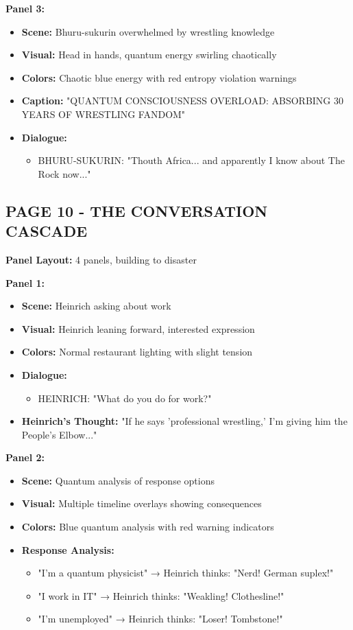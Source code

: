 \documentclass[12pt,a4paper]{article}
\begin{document}
\textbf{Panel 3:}
\begin{itemize}
\item \textbf{Scene:} Bhuru-sukurin overwhelmed by wrestling knowledge
\item \textbf{Visual:} Head in hands, quantum energy swirling chaotically
\item \textbf{Colors:} Chaotic blue energy with red entropy violation warnings
\item \textbf{Caption:} "QUANTUM CONSCIOUSNESS OVERLOAD: ABSORBING 30 YEARS OF WRESTLING FANDOM"
\item \textbf{Dialogue:}
\begin{itemize}
\item BHURU-SUKURIN: "Thouth Africa... and apparently I know about The Rock now..."
\end{itemize}
\end{itemize}

\subsection{PAGE 10 - THE CONVERSATION CASCADE}

\textbf{Panel Layout:} 4 panels, building to disaster

\textbf{Panel 1:}
\begin{itemize}
\item \textbf{Scene:} Heinrich asking about work
\item \textbf{Visual:} Heinrich leaning forward, interested expression
\item \textbf{Colors:} Normal restaurant lighting with slight tension
\item \textbf{Dialogue:}
\begin{itemize}
\item HEINRICH: "What do you do for work?"
\end{itemize}
\item \textbf{Heinrich's Thought:} "If he says 'professional wrestling,' I'm giving him the People's Elbow..."
\end{itemize}

\textbf{Panel 2:}
\begin{itemize}
\item \textbf{Scene:} Quantum analysis of response options
\item \textbf{Visual:} Multiple timeline overlays showing consequences
\item \textbf{Colors:} Blue quantum analysis with red warning indicators
\item \textbf{Response Analysis:}
\begin{itemize}
\item "I'm a quantum physicist" → Heinrich thinks: "Nerd! German suplex!"
\item "I work in IT" → Heinrich thinks: "Weakling! Clothesline!"
\item "I'm unemployed" → Heinrich thinks: "Loser! Tombstone!"
\end{itemize}
\end{itemize}
\end{document}

